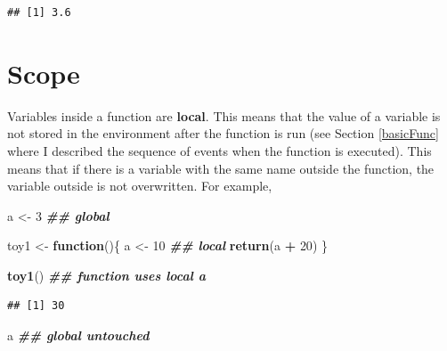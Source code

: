 \documentclass[
]{book}
\newenvironment{Shaded}{\begin{snugshade}}{\end{snugshade}}
\newcommand{\ControlFlowTok}[1]{\textcolor[rgb]{0.13,0.29,0.53}{\textbf{#1}}}
\newcommand{\DecValTok}[1]{\textcolor[rgb]{0.00,0.00,0.81}{#1}}
\newcommand{\DocumentationTok}[1]{\textcolor[rgb]{0.56,0.35,0.01}{\textbf{\textit{#1}}}}
\newcommand{\FunctionTok}[1]{\textcolor[rgb]{0.13,0.29,0.53}{\textbf{#1}}}
\newcommand{\NormalTok}[1]{#1}
\newcommand{\OtherTok}[1]{\textcolor[rgb]{0.56,0.35,0.01}{#1}}
\newcommand{\SpecialCharTok}[1]{\textcolor[rgb]{0.81,0.36,0.00}{\textbf{#1}}}
\theoremstyle{definition}
\theoremstyle{definition}
\theoremstyle{definition}
\theoremstyle{definition}
\theoremstyle{remark}
\begin{document}
\begin{Shaded}
\end{Shaded}

\begin{verbatim}
## [1] 3.6
\end{verbatim}

\hypertarget{scope}{%
\section{Scope}\label{scope}}

Variables inside a function are \textbf{local}. This means that the value of a variable is not stored in the environment after the function is run (see Section \ref{basicFunc} where I described the sequence of events when the function is executed). This means that if there is a variable with the same name outside the function, the variable outside is not overwritten. For example,

\begin{Shaded}
\begin{Highlighting}[]
\NormalTok{a }\OtherTok{\textless{}{-}} \DecValTok{3} \DocumentationTok{\#\# global}

\NormalTok{toy1 }\OtherTok{\textless{}{-}} \ControlFlowTok{function}\NormalTok{()\{}
\NormalTok{  a }\OtherTok{\textless{}{-}} \DecValTok{10} \DocumentationTok{\#\# local}
  \FunctionTok{return}\NormalTok{(a }\SpecialCharTok{+} \DecValTok{20}\NormalTok{)}
\NormalTok{\}}

\FunctionTok{toy1}\NormalTok{() }\DocumentationTok{\#\# function uses local a}
\end{Highlighting}
\end{Shaded}

\begin{verbatim}
## [1] 30
\end{verbatim}

\begin{Shaded}
\begin{Highlighting}[]
\NormalTok{a }\DocumentationTok{\#\# global untouched}
\end{Highlighting}
\end{Shaded}
\end{document}
